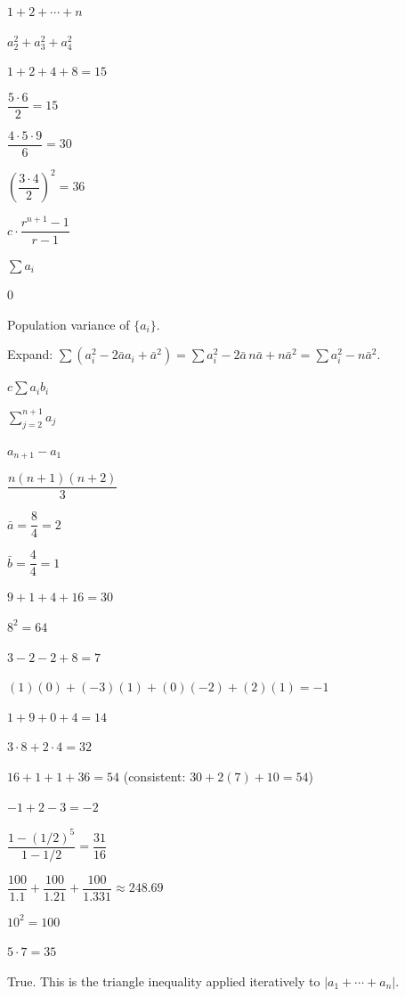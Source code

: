 \begin{solutions}
  \item $1+2+\cdots+n$
  \item $a_{2}^{2}+a_{3}^{2}+a_{4}^{2}$
  \item $1+2+4+8=15$
  \item $\dfrac{5\cdot 6}{2}=15$
  \item $\dfrac{4\cdot 5\cdot 9}{6}=30$
  \item $\left(\dfrac{3\cdot 4}{2}\right)^{2}=36$
  \item $c\cdot\dfrac{r^{n+1}-1}{r-1}$
  \item $\displaystyle\sum a_{i}$
  \item $0$
  \item Population variance of $\{a_{i}\}$.
  \item Expand: $\sum(a_{i}^{2}-2\bar a a_{i}+\bar a^{2})
        =\sum a_{i}^{2}-2\bar a\,n\bar a+n\bar a^{2}
        =\sum a_{i}^{2}-n\bar a^{2}$.
  \item $c\displaystyle\sum a_{i}b_{i}$
  \item $\displaystyle\sum_{j=2}^{n+1}a_{j}$
  \item $a_{n+1}-a_{1}$
  \item $\dfrac{n(n+1)(n+2)}{3}$
  \item $\bar a=\dfrac{8}{4}=2$
  \item $\bar b=\dfrac{4}{4}=1$
  \item $9+1+4+16=30$
  \item $8^{2}=64$
  \item $3-2-2+8=7$
  \item $(1)(0)+(-3)(1)+(0)(-2)+(2)(1)=-1$
  \item $1+9+0+4=14$
  \item $3\cdot 8+2\cdot 4=32$
  \item $16+1+1+36=54$ (consistent: $30+2(7)+10=54$)
  \item $-1+2-3=-2$
  \item $\dfrac{1-(1/2)^{5}}{1-1/2}=\dfrac{31}{16}$
  \item $\dfrac{100}{1.1}+\dfrac{100}{1.21}+\dfrac{100}{1.331}\approx
        248.69$
  \item $10^{2}=100$
  \item $5\cdot 7=35$
  \item True. This is the triangle inequality applied iteratively to
        $|a_{1}+\cdots+a_{n}|$.
\end{solutions}

